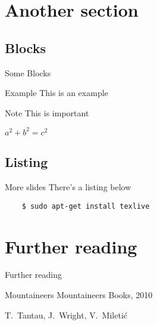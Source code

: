 \documentclass[compress,aspectratio=169]{beamer}
\begin{document}
\section{Another section}
\subsection{Blocks}
\begin{frame}{Some Blocks}
    \begin{exampleblock}{Example}
        This is an example
    \end{exampleblock}
    
    \begin{alertblock}{Note}
        This is important
    \end{alertblock}

    \begin{theorem}[Pythagoras] 
        $ a^2 + b^2 = c^2$
    \end{theorem}
\end{frame}

\subsection{Listing}
\begin{frame}[containsverbatim]{More slides}
    There's a listing below
    \lstset{language=bash}
    \begin{lstlisting}
    $ sudo apt-get install texlive
    \end{lstlisting}%
\end{frame}

\section{Further reading}
\begin{frame}{Further reading}
	\begin{thebibliography}{10}
    
	\beamertemplatebookbibitems
	Mountaineers
	\newblock {}
	\newblock Mountaineers Books, 2010

	\beamertemplatearticlebibitems
	T.~Tantau, J.~Wright, V.~Miletić
	\newblock {}
  \end{thebibliography}
\end{frame}
\end{document}
